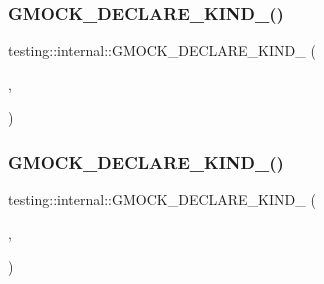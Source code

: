 \subsubsection{\texorpdfstring{GMOCK\_DECLARE\_KIND\_()}{GMOCK\_DECLARE\_KIND\_()}\hspace{0.1cm}{\footnotesize\ttfamily [12/16]}}
{\footnotesize\ttfamily testing\+::internal\+::\+G\+M\+O\+C\+K\+\_\+\+D\+E\+C\+L\+A\+R\+E\+\_\+\+K\+I\+N\+D\+\_\+ (\begin{DoxyParamCaption}\item[{\mbox{\hyperlink{namespacetesting_1_1internal_abd4adb4f2e2d7078a473de91a4089501}{Int64}}}]{,  }\item[{\mbox{\hyperlink{namespacetesting_1_1internal_aa8747bda20137c9aa7f846dee830e686a5231ca28c8f44ffd8ca4ddf0f14e407e}{k\+Integer}}}]{ }\end{DoxyParamCaption})}

\mbox{\label{namespacetesting_1_1internal_ae09394c3d07a5d99308fc3bbc9edc877}} 
\subsubsection{\texorpdfstring{GMOCK\_DECLARE\_KIND\_()}{GMOCK\_DECLARE\_KIND\_()}\hspace{0.1cm}{\footnotesize\ttfamily [13/16]}}
{\footnotesize\ttfamily testing\+::internal\+::\+G\+M\+O\+C\+K\+\_\+\+D\+E\+C\+L\+A\+R\+E\+\_\+\+K\+I\+N\+D\+\_\+ (\begin{DoxyParamCaption}\item[{\mbox{\hyperlink{namespacetesting_1_1internal_ad24ae0a18ae0d3758b9a8333a0b56a4b}{U\+Int64}}}]{,  }\item[{\mbox{\hyperlink{namespacetesting_1_1internal_aa8747bda20137c9aa7f846dee830e686a5231ca28c8f44ffd8ca4ddf0f14e407e}{k\+Integer}}}]{ }\end{DoxyParamCaption})}

\mbox{\label{namespacetesting_1_1internal_ad4ebf1b53b79ac38fbd18ccf4d63ceca}} 

